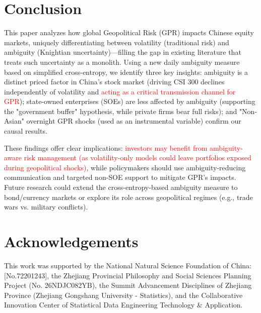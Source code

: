 \documentclass[preprint,12pt,authoryear]{elsarticle}
\begin{document}
\section{Conclusion}
\label{sec:conclusion}

This paper analyzes how global Geopolitical Risk (GPR) impacts Chinese equity markets, uniquely differentiating between volatility (traditional risk) and ambiguity (Knightian uncertainty)—filling the gap in existing literature that treats such uncertainty as a monolith. Using a new daily ambiguity measure based on simplified cross-entropy, we identify three key insights: ambiguity is a distinct priced factor in China’s stock market (driving CSI 300 declines independently of volatility and \textcolor{red}{acting as a critical transmission channel for GPR}); state-owned enterprises (SOEs) are less affected by ambiguity (supporting the "government buffer" hypothesis, while private firms bear full risks); and "Non-Asian" overnight GPR shocks (used as an instrumental variable) confirm our causal results.

These findings offer clear implications: \textcolor{red}{investors may benefit from ambiguity-aware risk management (as volatility-only models could leave portfolios exposed during geopolitical shocks)}, while policymakers should use ambiguity-reducing communication and targeted non-SOE support to mitigate GPR’s impacts. Future research could extend the cross-entropy-based ambiguity measure to bond/currency markets or explore its role across geopolitical regimes (e.g., trade wars vs. military conflicts).




\clearpage
\section*{Acknowledgements}
This work was supported by the National Natural Science Foundation of China:[No.72201243], the Zhejiang Provincial Philosophy and Social Sciences Planning Project (No. 26NDJC082YB), the Summit Advancement Disciplines of Zhejiang Province (Zhejiang Gongshang University - Statistics), and the Collaborative Innovation Center of Statistical Data Engineering Technology \& Application.

\appendix
\end{document}
